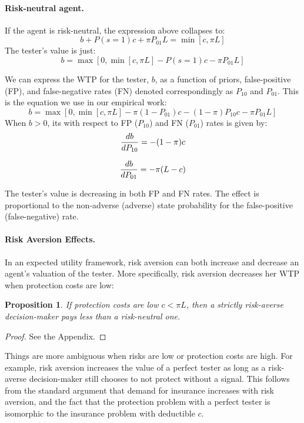 \documentclass[12pt,a4paper]{article}
\newtheorem{theorem}{Proposition}
\begin{document}
\paragraph{Risk-neutral agent.} If the agent is risk-neutral, the expression above collapses to:
\[b+P(s=1)c+\pi P_{01}L=\min[c,\pi L]
\]
The tester's value is just:
\[
b=\max[0,\min[c,\pi L]-P(s=1)c-\pi P_{01}L]
\]

We can express the WTP for the tester, $b$, as a function of priors, false-positive (FP), and false-negative rates (FN) denoted correspondingly as $P_{10}$ and $P_{01}$. This is the equation we use in our empirical work:
\begin{equation}
b=\max[0,\min[c,\pi L]-\pi (1-P_{01})c-(1-\pi)P_{10}c-\pi P_{01}L]
\end{equation}\label{eq:rnWTP}
When $b>0$, its with respect to FP ($P_{10}$) and FN ($P_{01}$) rates is given by:
\begin{equation}\label{eq:dWTP_dFP}
{db\over dP_{10}}=-(1-\pi)c
\end{equation}

\begin{equation}\label{eq:dWTP_dFN}
{db\over dP_{01}}=-\pi(L-c)
\end{equation}
\vspace{10pt}

The tester's value is decreasing in both FP and FN rates. The effect is proportional to the non-adverse (adverse) state probability for the false-positive (false-negative) rate.

\paragraph{Risk Aversion Effects.} In an expected utility framework, risk aversion can both increase and decrease an agent's valuation of the tester. More specifically, risk aversion decreases her WTP when protection costs are low: 

\begin{theorem}
 If protection costs are low $c<\pi L$, then a strictly risk-averse decision-maker pays less than a risk-neutral one.
\end{theorem} 
\begin{proof}
See the Appendix.
\end{proof}

Things are more ambiguous when risks are low or protection costs are high. For example, risk aversion increases the value of a perfect tester as long as a risk-averse decision-maker still chooses to not protect without a signal. This follows from the standard argument that demand for insurance increases with risk aversion, and the fact that the protection problem with a perfect tester is isomorphic to the insurance problem with deductible $c$. 
\end{document}
